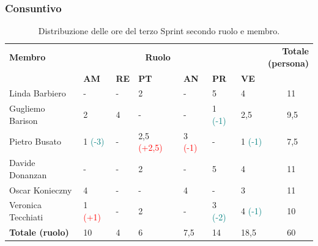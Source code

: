 \subsubsection{Consuntivo}
\begin{table}[ht!]
	\centering
	\begin{tabular}{p{3cm} p{1.4cm} p{1.6cm} p{1.7cm} p{1.4cm} p{1.4cm} p{1.5cm} p{2cm}}
		\toprule
        \textbf{Membro} & \multicolumn{5}{c}{\textbf{Ruolo}} & \multicolumn{2}{r}{\textbf{Totale (persona)}}\\
		& \textbf{AM} & \textbf{RE} & \textbf{PT} & \textbf{AN} & \textbf{PR} & \textbf{VE}\\
		\midrule
        Linda Barbiero     & - & - & 2 & -   & 5 & 4 & 11 \\
        Gugliemo Barison   & 2 & 4 & - & -   & 1 \textcolor{teal}{(-1)} & 2,5 & 9,5 \\
        Pietro Busato      & 1 \textcolor{teal}{(-3)} & - & 2,5 \textcolor{red}{(+2,5)} & 3
        \textcolor{red}{(-1)} & - & 1 \textcolor{teal}{(-1)} & 7,5 \\
        Davide Donanzan    & - & - & 2 & -   & 5 & 4 & 11 \\
        Oscar Konieczny    & 4 & - & - & 4   & - & 3 & 11 \\
        Veronica Tecchiati & 1 \textcolor{red}{(+1)} & -  & 2 & -   & 3 \textcolor{teal}{(-2)} & 4
        \textcolor{teal}{(-1)}  & 10 \\
        \midrule
        \textbf{Totale (ruolo)} & 10 & 4 & 6 & 7,5 & 14 & 18,5 & 60 \\
		\bottomrule
	\end{tabular}
	\caption{Distribuzione delle ore del terzo Sprint secondo ruolo e membro.}
	\label{table:Distribuzione delle ore del terzo Sprint secondo ruolo e membr}
\end{table}
